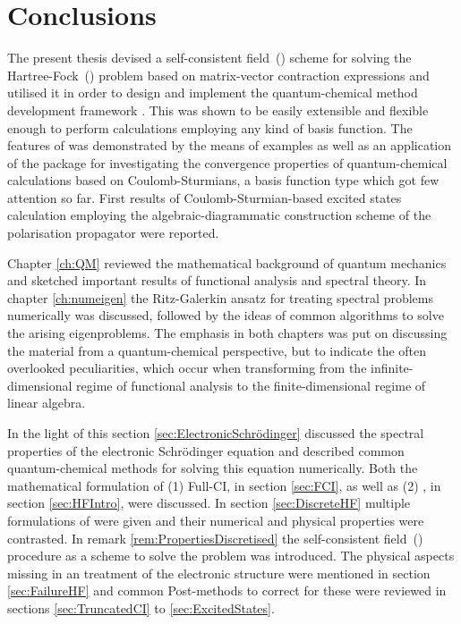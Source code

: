 \chapter{Conclusions}
\label{ch:Conclusion}

\noindent
The present thesis devised a self-consistent field~(\SCF)
scheme for solving the Hartree-Fock~(\HF) problem
based on matrix-vector contraction expressions
and utilised it in order to design and implement the
quantum-chemical method development framework \molsturm.
This was shown to be easily extensible and flexible enough
to perform calculations
employing any kind of basis function.
The features of \molsturm was demonstrated by the means
of examples as well as an application of the package for
investigating the convergence properties
of quantum-chemical calculations
based on Coulomb-Sturmians,
a basis function type which got few attention so far.
First results of Coulomb-Sturmian-based excited states
calculation employing the algebraic-diagrammatic construction scheme
of the polarisation propagator were reported.


Chapter \ref{ch:QM} reviewed the mathematical background of quantum mechanics
and sketched important results of functional analysis
and spectral theory.
In chapter \ref{ch:numeigen} the Ritz-Galerkin ansatz
for treating spectral problems numerically
was discussed, followed by the ideas of common algorithms
to solve the arising eigenproblems.
The emphasis in both chapters
was put on discussing the material from a quantum-chemical perspective,
but to indicate the often overlooked peculiarities,
which occur when transforming from the infinite-dimensional regime
of functional analysis to the finite-dimensional regime of linear algebra.


In the light of this section \ref{sec:ElectronicSchrödinger}
discussed the spectral properties
of the electronic Schrödinger equation and
described common quantum-chemical methods
for solving this equation numerically.
Both the mathematical formulation of (1) Full-CI, in section \ref{sec:FCI},
as well as (2) \HF, in section \ref{sec:HFIntro}, were discussed.
In section \ref{sec:DiscreteHF} multiple formulations of \HF were given
and their numerical and physical properties were contrasted.
In remark \ref{rem:PropertiesDiscretised}
the self-consistent field~(\SCF) procedure
as a scheme to solve the \HF problem was introduced.
The physical aspects missing in an \HF treatment of the electronic
structure were mentioned in section \ref{sec:FailureHF}
and common Post-\HF methods to correct for these were
reviewed in sections \ref{sec:TruncatedCI} to \ref{sec:ExcitedStates}.

